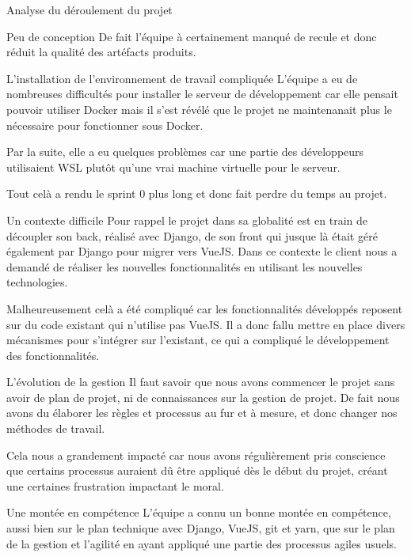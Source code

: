 \documentclass[]{article}
\begin{document}
{\begin{section}{Analyse du déroulement du projet}
\begin{subsection}{Peu de conception}
     De fait l'équipe à certainement manqué de recule et donc réduit la qualité des artéfacts produits.
 \end{subsection}

 \begin{subsection}{L'installation de l'environnement de travail compliquée}
     L'équipe a eu de nombreuses difficultés pour installer le serveur de développement car elle pensait pouvoir utiliser Docker mais il s'est révélé que le projet ne maintenanait plus le nécessaire pour fonctionner sous Docker.

     Par la suite, elle a eu quelques problèmes car une partie des développeurs utilisaient WSL plutôt qu'une vrai machine virtuelle pour le serveur.

     Tout celà a rendu le sprint 0 plus long et donc fait perdre du temps au projet.
 \end{subsection}

 \begin{subsection}{Un contexte difficile}
     Pour rappel le projet dans sa globalité est en train de découpler son back, réalisé avec Django, de son front qui jusque là était géré également par Django pour migrer vers VueJS. Dans ce contexte le client nous a demandé de réaliser les nouvelles fonctionnalités en utilisant les nouvelles technologies.

     Malheureusement celà a été compliqué car les fonctionnalités développés reposent sur du code existant qui n'utilise pas VueJS. Il a donc fallu mettre en place divers mécanismes pour s'intégrer sur l'existant, ce qui a compliqué le développement des fonctionnalités.
 \end{subsection}

 \begin{subsection}{L'évolution de la gestion}
    Il faut savoir que nous avons commencer le projet sans avoir de plan de projet, ni de connaissances sur la gestion de projet. De fait nous avons du élaborer les règles et processus au fur et à mesure, et donc changer nos méthodes de travail. 
    
    Cela nous a grandement impacté car nous avons régulièrement pris conscience que certains processus auraient dû être appliqué dès le début du projet, créant une certaines frustration impactant le moral.
 \end{subsection}

 \begin{subsection}{Une montée en compétence}
     L'équipe a connu un bonne montée en compétence, aussi bien sur le plan technique avec Django, VueJS, git et yarn, que sur le plan de la gestion et l'agilité en ayant appliqué une partie des processus agiles usuels.


\end{subsection}
\end{section}}
\end{document}

